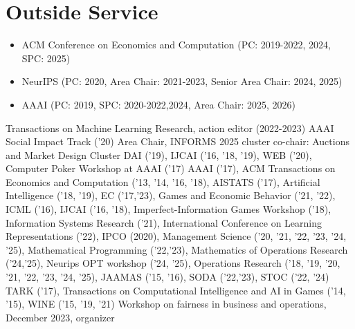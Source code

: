 \documentclass[11pt,a4paper,sans]{moderncv}        %
\begin{document}

\section{Outside Service}
{
  \begin{itemize}
    \item ACM Conference on Economics and Computation (PC: 2019-2022, 2024, SPC: 2025)
    \item NeurIPS (PC: 2020, Area Chair: 2021-2023, Senior Area Chair: 2024, 2025)
    \item AAAI (PC: 2019, SPC: 2020-2022,2024, Area Chair: 2025, 2026)
  \end{itemize}
}
{
  Transactions on Machine Learning Research, action editor (2022-2023)
}
{
  AAAI Social Impact Track ('20) Area Chair,
  INFORMS 2025 cluster co-chair: Auctions and Market Design Cluster
}
{
  DAI ('19),
  IJCAI ('16, '18, '19),
  WEB ('20),
  Computer Poker Workshop at AAAI ('17)
}
{
  AAAI ('17),
  ACM Transactions on Economics and Computation ('13, '14, '16, '18),
  AISTATS ('17),
  Artificial Intelligence ('18, '19),
  EC ('17,'23),
  Games and Economic Behavior ('21, '22),
  ICML ('16),
  IJCAI ('16, '18),
  Imperfect-Information Games Workshop ('18),
  Information Systems Research ('21),
  International Conference on Learning Representations ('22),
  IPCO (2020),
  Management Science ('20, '21, '22, '23, '24, '25),
  Mathematical Programming ('22,'23),
  Mathematics of Operations Research ('24,'25),
  Neurips OPT workshop ('24, '25),
  Operations Research ('18, '19, '20, '21, '22, '23, '24, '25),
  JAAMAS ('15, '16),
  SODA ('22,'23),
  STOC ('22, '24)
  TARK ('17),
  Transactions on Computational Intelligence and AI in Games ('14, '15),
  WINE ('15, '19, '21)
}
{
  Workshop on fairness in business and operations, December 2023, organizer
}
\end{document}
